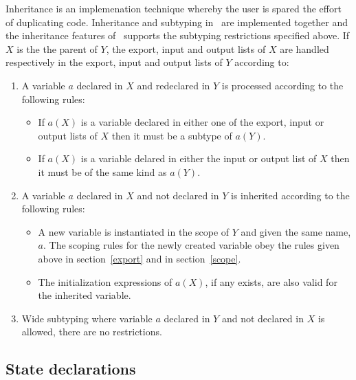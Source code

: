 Inheritance is an implemenation technique whereby the user is spared
the effort of duplicating code.  Inheritance and subtyping in \Shift\
are implemented together and the inheritance features of \Shift\
supports the subtyping restrictions specified above.  If $X$ is the
the parent of $Y$, the export, input and output lists of $X$ are
handled respectively in the export, input and output lists of $Y$
according to:

\begin{enumerate}

\item A variable $a$ declared in $X$ and redeclared in $Y$ is processed
according to the following rules:

	\begin{itemize}
	
	\item If $a(X)$ is a variable declared in either one of the
	export, input or output lists of $X$ then it must be a subtype
	of $a(Y)$.
	\item If $a(X)$ is a variable delared in either the input or
	output list of $X$ then it must be of the same kind as $a(Y)$.

	\end{itemize}

\item A variable $a$ declared in $X$ and not declared in $Y$ is inherited
according to the following rules:

	\begin{itemize}

	\item A new variable is instantiated in the scope of $Y$ and
	given the same name, $a$.  The scoping rules for the newly
	created variable obey the rules given above in section~\ref{export}
	and in section~\ref{scope}.
	\item The initialization expressions of $a(X)$, if any exists,
	are also valid for the inherited variable.

	\end{itemize}

\item Wide subtyping where variable $a$ declared in $Y$ and not
declared in $X$ is allowed, there are no restrictions.

\end{enumerate}

\subsection{State declarations\label{state}}

